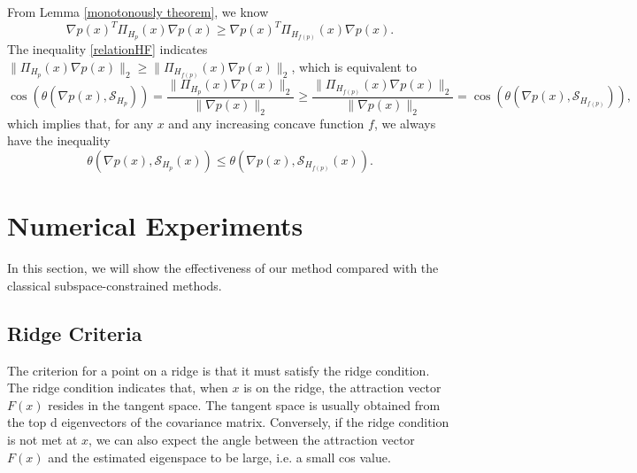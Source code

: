\documentclass[aos,preprint]{imsart}
\theoremstyle{remark}
\begin{document}
 From Lemma \ref{monotonously theorem}, we know
 \begin{equation}\label{relationHF}
 \nabla p(x)^T \Pi_{H_p}(x) \nabla p(x)\geq \nabla p(x)^T \Pi_{H_{f(p)}}(x) \nabla p(x).
 \end{equation}
 The inequality \eqref{relationHF} indicates $\| \Pi_{H_p}(x) \nabla p(x)\|_2 \geq  \|\Pi_{H_{f(p)}}(x) \nabla p(x)\|_2$, which is equivalent to 
 \begin{equation*}\label{angle_ineq}
\cos( \theta(\nabla p(x), {\mathcal S}_{H_p})) = \frac{\| \Pi_{H_p}(x) \nabla p(x)\|_2}{\|\nabla p(x)\|_2} 
\geq  \frac{\|\Pi_{H_{f(p)}}(x) \nabla p(x)\|_2}{\|\nabla p(x)\|_2} = \cos(\theta(\nabla p(x), {\mathcal S}_{H_{f(p)}})),
\end{equation*}
which implies that, for any $x$ and any increasing concave function $f$, we always have the inequality 
 \[
 \theta(\nabla p(x), {\mathcal S}_{H_{p}}(x)) \leq \theta(\nabla p(x), {\mathcal S}_{H_{f(p)}}(x)).\] 





\section{Numerical Experiments}\label{experiments}
In this section, we will show the effectiveness of our method compared with the classical subspace-constrained methods.
\subsection{Ridge Criteria}
The criterion for a point on a ridge is that it must satisfy the ridge condition. The ridge condition indicates that, when $x$ is on the ridge, the attraction vector $F(x)$ resides in the tangent space. The tangent space is usually obtained from the top d eigenvectors of the covariance matrix. Conversely, if the ridge condition is not met at $x$, we can also expect the angle between the attraction vector $F(x)$ and the estimated eigenspace to be large, i.e. a small cos value. 
\end{document}
